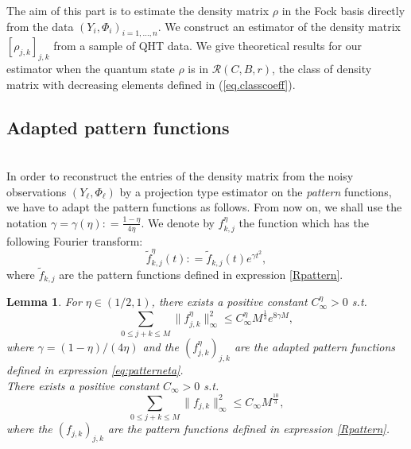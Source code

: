 \documentclass[a4paper]{amsart}
\newtheorem{lemma}{Lemma}[section]
\newcommand{\deq}{\mathrel{\mathop:} = } %
\begin{document}
The aim of this part is to estimate the density matrix $\rho$ in the Fock basis
directly from the data $(Y_i,\Phi_i)_{i=1,\ldots,n}$. We construct an estimator
of the density matrix $[\rho_{j,k}]_{j,k}$  from a sample of QHT data. We give
theoretical results for our estimator when the quantum state $\rho$ is in $
\mathcal{R}(C,B,r)$, the class of density matrix with decreasing elements
defined in (\ref{eq.classcoeff}).



\subsection{Adapted pattern functions}
\label{Pattern.functions}
\noindent\\


In order to reconstruct the entries of the density matrix from the noisy
observations $(Y_{\ell}, \Phi_{\ell})$ by a projection type estimator on the
\textit{pattern} functions, we have to adapt the pattern functions as follows. 
From now on, we shall use the notation $\gamma=\gamma(\eta) \deq
\frac{1-\eta}{4\eta}$.  We denote by $f^\eta_{k,j}$ the function which has
the following Fourier transform:
%
     \begin{equation}
      \label{eq:patterneta}
      \tilde{f}^\eta_{k,j}(t) \deq \tilde{f}_{k,j}(t) e^{\gamma t^2},
      \end{equation}
%      
where $ \tilde{f}_{k,j}$ are the pattern functions defined in expression
\eqref{Rpattern}. 

\begin{lemma}
         \label{norm}
         For $\eta\in(1/2,1)$, there exists a positive constant
$C^\eta_{\infty}>0$ s.t.
          \begin{equation}
                         \label{normfeta}
                         \sum_{0\leq j+k\leq M} \|f_{j,k}^{\eta}\|_{\infty}^{2}
\leq C_{\infty}^{\eta} M^{\frac{1}{3}}  e^{8\gamma M},
          \end{equation}
          where $\gamma=(1-\eta)/(4\eta)$ and the $(f_{j,k}^{\eta})_{j,k}$ are
the adapted pattern functions defined in expression \eqref{eq:patterneta}.\\
          There exists a positive constant $C_{\infty}>0$ s.t.
           \begin{equation}
                   \label{normf}
                   \sum_{0\leq j+k\leq M} \|f_{j,k}\|_{\infty}^{2} \leq C_\infty
M^{\frac{10}{3}},
           \end{equation}
          where the $ (f_{j,k})_{j,k}$ are the pattern functions defined in
expression \eqref{Rpattern}.
 \end{lemma}
\end{document}
